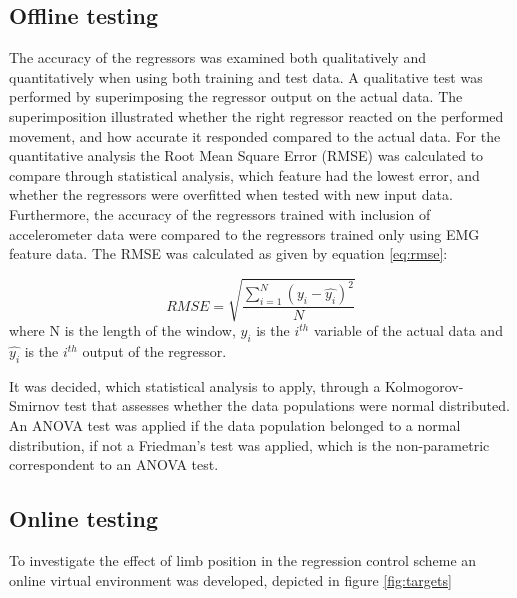 \documentclass[a4paper, 10pt, conference]{ieeeconf}      %
\begin{document}
\subsection{Offline testing}
The accuracy of the regressors was examined both qualitatively and quantitatively when using both training and test data. A qualitative test was performed by superimposing the regressor output on the actual data. The superimposition illustrated whether the right regressor reacted on the performed movement, and how accurate it responded compared to the actual data. For the quantitative analysis the Root Mean Square Error (RMSE) was calculated to compare through statistical analysis, which feature had the lowest error, and whether the regressors were overfitted when tested with new input data. Furthermore, the accuracy of the regressors trained with inclusion of accelerometer data were compared to the regressors trained only using EMG feature data. The RMSE was calculated as given by equation \ref{eq:rmse}:

\begin{equation} \label{eq:rmse}
RMSE = \sqrt{\frac{\sum\limits_{i=1}^N(y_i - \hat{y_i})^2}{N}}
\end{equation}
where N is the length of the window, $y_i$ is the $i^{th}$ variable of the actual data and $\hat{y_i}$ is the $i^{th}$ output of the regressor.

It was decided, which statistical analysis to apply, through a Kolmogorov-Smirnov test that assesses whether the data populations were normal distributed. An ANOVA test was applied if the data population belonged to a normal distribution, if not a Friedman's test was applied, which is the non-parametric correspondent to an ANOVA test.

\subsection{Online testing}
To investigate the effect of limb position in the regression control scheme an online virtual environment was developed, depicted in figure \ref{fig:targets}
\end{document}
